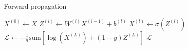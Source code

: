 \documentclass[11pt,twocolumn]{article}
\begin{document}
%
\begin{algorithm}
\caption{Forward propagation}\label{alg:fwd}
\begin{algorithmic}
	\State $X^{(0)} \gets X$
		\State $Z^{(l)} \gets W^{(l)}X^{(l-1)}+b^{(l)}$
		\State $X^{(l)} \gets \sigma(Z^{(l)} )$
	\EndFor
	\State $\mathcal{L} \gets -\frac{1}{n} \textrm{sum}{\left[\log(X^{(L)})+(1-y)Z^{(L)}\right]}$
	\State \Return $\mathcal{L}$
\EndProcedure
\end{algorithmic}
\end{algorithm}
\end{document}
